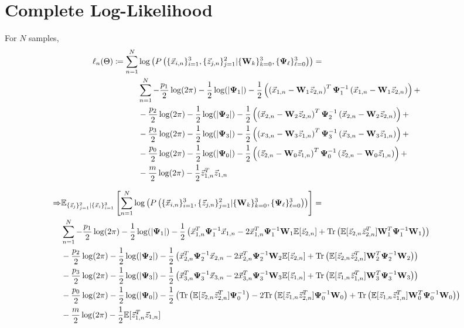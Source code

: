 \section{Complete Log-Likelihood}
For $N$ samples, 
\begin{equation}
\begin{split}
\ell_n(\Theta) \coloneqq \sum_{n=1}^N & \log  \left( P \left( \{\vec{x}_{i,n}\}_{i=1}^3,\{ \vec{z}_{j,n}\}_{j=1}^2| \{\bold{W}_k\}_{k=0}^3, \{\bold{\Psi}_{\ell}\}_{\ell=0}^3 \right) \right) = \\
&\sum_{n=1}^N -\frac{p_1}{2} \log (2 \pi) - \frac{1}{2} \log(|\bold{\Psi}_1|) -
\frac{1}{2} \left( \left( \vec{x}_{1,n} - \bold{W}_1 \vec{z}_{2,n} \right)^T \bold{\Psi}_1^{-1} \left(
    \vec{x}_{1,n} - \bold{W}_1 \vec{z}_{2,n} \right) \right) + \\
& -\frac{p_2}{2} \log (2 \pi) - \frac{1}{2} \log(|\bold{\Psi}_2|) -
\frac{1}{2} \left( \left( \vec{x}_{2,n} - \bold{W}_2 \vec{z}_{2,n} \right)^T \bold{\Psi}_2^{-1} \left(
    \vec{x}_{2,n} - \bold{W}_2 \vec{z}_{2,n} \right) \right) + \\
& -\frac{p_3}{2} \log (2 \pi) - \frac{1}{2} \log(|\bold{\Psi}_3|) -
\frac{1}{2} \left( \left( x_{3,n} - \bold{W}_3 \vec{z}_{1,n} \right)^T \bold{\Psi}_3^{-1} \left(
    \vec{x}_{3,n} - \bold{W}_3 \vec{z}_{1,n} \right) \right) + \\
& -\frac{p_0}{2} \log (2 \pi) - \frac{1}{2} \log(|\bold{\Psi}_0|) -
\frac{1}{2} \left( \left( \vec{z}_{2,n} - \bold{W}_0 \vec{z}_{1,n} \right)^T \bold{\Psi}_0^{-1} \left(
    \vec{z}_{2,n} - \bold{W}_0 \vec{z}_{1,n} \right) \right) + \\
& -\frac{m}{2} \log (2 \pi) - \frac{1}{2} \vec{z}_{1,n}^T \vec{z}_{1,n} 
\end{split}
\end{equation}



\newcommand{\ecll}{\ev_{\{ \z_j\}_{j=1}^2 | \{\x_i\}_{i=1}^3}
  \left[ \sum_{n=1}^N \log \left( \fulljointp \right) \right] }
\begin{equation}
\begin{split}
\Rightarrow & \ecll= \\
& \sum_{n=1}^N - \frac{p_1}{2} \log (2\pi) - \frac{1}{2} \log( |\bpsi_1| ) -
\frac{1}{2} \left(
  \x_{1,n}^T \bpsi_1^{-1} \x_{1,n} - 2 \x_{1,n}^T    \bpsi_1^{-1} \W_1 \ev[ \z_{2,n}] +
  \Tr \left( \ev[\z_{2,n} \z_{2,n}^T ] \W_1^T  \bpsi_1^{-1}
    \W_1\right) \right)\\
& - \frac{p_2}{2} \log (2\pi) - \frac{1}{2} \log( |\bpsi_2| ) -
\frac{1}{2} \left(
\x_{2,n}^T \bpsi_2^{-1} \x_{2,n} - 2 \x_{2,n}^T    \bpsi_2^{-1} \W_2 \ev[\z_{2,n}] +
  \Tr \left( \ev[\z_{2,n} \z_{2,n}^T ] \W_2^T  \bpsi_2^{-1}
    \W_2\right) \right)\\
& - \frac{p_3}{2} \log (2\pi) - \frac{1}{2} \log( |\bpsi_3| ) -
\frac{1}{2} \left(
\x_{3,n}^T \bpsi_3^{-1} \x_{3,n} - 2 \x_{3,n}^T    \bpsi_3^{-1} \W_3 \ev[\z_{1,n} ]+
  \Tr \left( \ev[\z_{1,n} \z_{1,n}^T ] \W_3^T  \bpsi_3^{-1}
    \W_3\right) \right)\\
& - \frac{p_0}{2} \log (2\pi) - \frac{1}{2} \log( |\bpsi_0| ) -
\frac{1}{2} \left(
\Tr \left( \ev [\z_{2,n} \z_{2,n}^T] \bpsi_0^{-1} \right)  - 2 \Tr \left( \ev[\z_{1,n}\z_{2,n}^T]
  \bpsi_0^{-1} \W_0 \right) +
  \Tr \left( \ev[\z_{1,n} \z_{1,n}^T ] \W_0^T  \bpsi_0^{-1}
    \W_0\right) \right)\\
& -\frac{m}{2} \log( 2 \pi) - \frac{1}{2} \ev [ \z_{1,n}^T \z_{1,n}]
\end{split}
\end{equation}
\pagebreak

